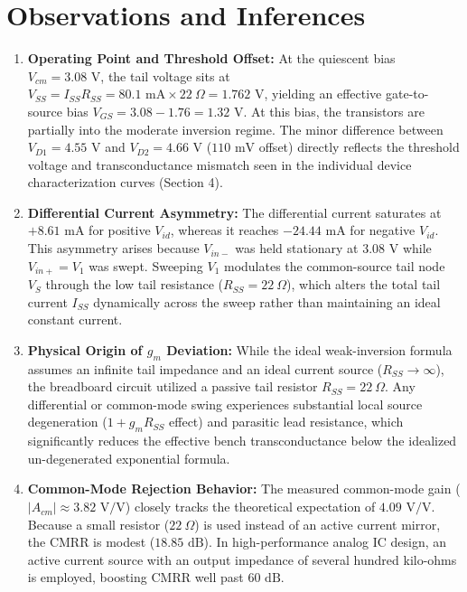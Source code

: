 \documentclass[11pt,a4paper]{article}
\begin{document}
\section{Observations and Inferences}
\begin{enumerate}
    \item \textbf{Operating Point and Threshold Offset:} At the quiescent bias $V_{cm} = 3.08\text{ V}$, the tail voltage sits at $V_{SS} = I_{SS} R_{SS} = 80.1\text{ mA} \times 22\ \Omega = 1.762\text{ V}$, yielding an effective gate-to-source bias $V_{GS} = 3.08 - 1.76 = 1.32\text{ V}$. At this bias, the transistors are partially into the moderate inversion regime. The minor difference between $V_{D1} = 4.55\text{ V}$ and $V_{D2} = 4.66\text{ V}$ ($110\text{ mV}$ offset) directly reflects the threshold voltage and transconductance mismatch seen in the individual device characterization curves (Section 4).
    \item \textbf{Differential Current Asymmetry:} The differential current saturates at $+8.61\text{ mA}$ for positive $V_{id}$, whereas it reaches $-24.44\text{ mA}$ for negative $V_{id}$. This asymmetry arises because $V_{in-}$ was held stationary at $3.08\text{ V}$ while $V_{in+} = V_1$ was swept. Sweeping $V_1$ modulates the common-source tail node $V_S$ through the low tail resistance ($R_{SS} = 22\ \Omega$), which alters the total tail current $I_{SS}$ dynamically across the sweep rather than maintaining an ideal constant current.
    \item \textbf{Physical Origin of $g_m$ Deviation:} While the ideal weak-inversion formula assumes an infinite tail impedance and an ideal current source ($R_{SS} \to \infty$), the breadboard circuit utilized a passive tail resistor $R_{SS} = 22\ \Omega$. Any differential or common-mode swing experiences substantial local source degeneration ($1 + g_m R_{SS}$ effect) and parasitic lead resistance, which significantly reduces the effective bench transconductance below the idealized un-degenerated exponential formula.
    \item \textbf{Common-Mode Rejection Behavior:} The measured common-mode gain ($|A_{cm}| \approx 3.82\text{ V/V}$) closely tracks the theoretical expectation of $4.09\text{ V/V}$. Because a small resistor ($22\ \Omega$) is used instead of an active current mirror, the CMRR is modest ($18.85\text{ dB}$). In high-performance analog IC design, an active current source with an output impedance of several hundred kilo-ohms is employed, boosting CMRR well past $60\text{ dB}$.
\end{enumerate}
\end{document}

